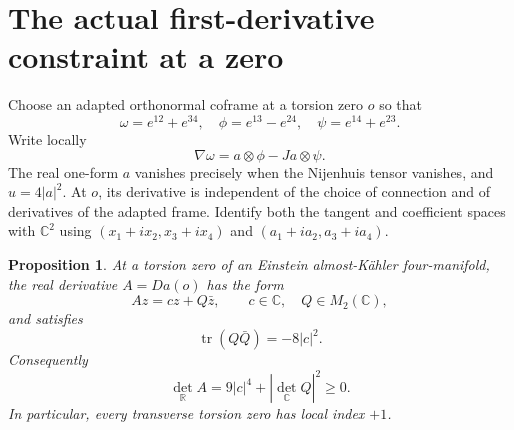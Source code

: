 \documentclass[11pt]{article}
\newtheorem{proposition}{Proposition}
\newcommand{\tr}{\operatorname{tr}}
\begin{document}
\section{The actual first-derivative constraint at a zero}
Choose an adapted orthonormal coframe at a torsion zero $o$ so that
\[
\omega=e^{12}+e^{34},\quad \phi=e^{13}-e^{24},\quad \psi=e^{14}+e^{23}.
\]
Write locally
\[
\nabla\omega=a\otimes\phi-Ja\otimes\psi.
\]
The real one-form $a$ vanishes precisely when the Nijenhuis tensor vanishes, and $u=4|a|^2$. At $o$, its derivative is independent of the choice of connection and of derivatives of the adapted frame. Identify both the tangent and coefficient spaces with $\mathbb C^2$ using $(x_1+ix_2,x_3+ix_4)$ and $(a_1+ia_2,a_3+ia_4)$.

\begin{proposition}\label{index}
At a torsion zero of an Einstein almost-K\"ahler four-manifold, the real derivative $A=Da(o)$ has the form
\begin{equation}\label{linear}
 Az=c z+Q\bar z,\qquad c\in\mathbb C,\quad Q\in M_2(\mathbb C),
\end{equation}
and satisfies
\begin{equation}\label{constraint}
\tr(Q\bar Q)=-8|c|^2.
\end{equation}
Consequently
\begin{equation}\label{det}
\det_{\mathbb R}A=9|c|^4+|\det_{\mathbb C}Q|^2\ge0.
\end{equation}
In particular, every transverse torsion zero has local index $+1$.
\end{proposition}
\end{document}
